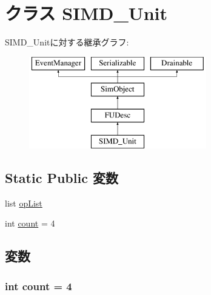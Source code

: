 \hypertarget{classFuncUnitConfig_1_1SIMD__Unit}{
\section{クラス SIMD\_\-Unit}
\label{classFuncUnitConfig_1_1SIMD__Unit}
}
SIMD\_\-Unitに対する継承グラフ:\begin{figure}[H]
\begin{center}
\leavevmode
\includegraphics[height=4cm]{classFuncUnitConfig_1_1SIMD__Unit}
\end{center}
\end{figure}
\subsection*{Static Public 変数}
\begin{DoxyCompactItemize}
\item 
list \hyperlink{classFuncUnitConfig_1_1SIMD__Unit_a31b2f9e3ac9a504397b140f513c469cc}{opList}
\item 
int \hyperlink{classFuncUnitConfig_1_1SIMD__Unit_ad43c3812e6d13e0518d9f8b8f463ffcf}{count} = 4
\end{DoxyCompactItemize}


\subsection{変数}
\hypertarget{classFuncUnitConfig_1_1SIMD__Unit_ad43c3812e6d13e0518d9f8b8f463ffcf}{
\subsubsection[{count}]{\setlength{\rightskip}{0pt plus 5cm}int {\bf count} = 4}}
\label{classFuncUnitConfig_1_1SIMD__Unit_ad43c3812e6d13e0518d9f8b8f463ffcf}


